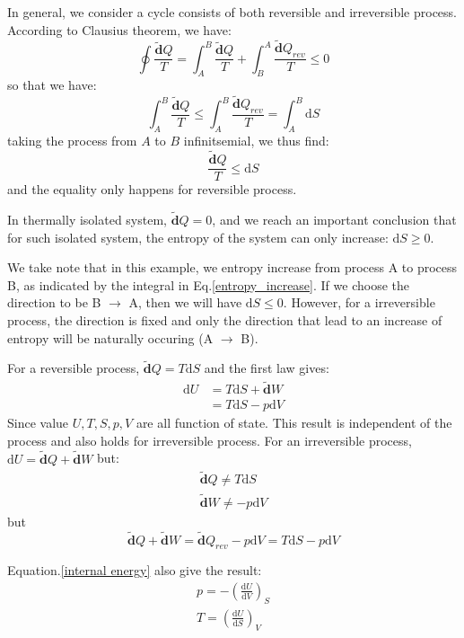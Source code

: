 \documentclass{article}
\newcommand{\dbar}{\mathbf{\tilde{d}}}
\newcommand{\dnor}{\text{d}}
\begin{document}
In general, we consider a cycle consists of both reversible and 
irreversible process. According to Clausius theorem, we have:
\begin{equation}
    \oint \frac{\dbar Q}{T} = \int_A^B \frac{\dbar Q}{T} + \int_B^A \frac{\dbar Q_{rev}}{T} \le 0
\end{equation}
so that we have:
\begin{equation}
    \int_A^B \frac{\dbar Q}{T} \le \int_A^B \frac{\dbar Q_{rev}}{T} = \int_A^B \dnor S  \label{entropy_increase}
\end{equation}
taking the process from $A$ to $B$ infinitsemial, we thus find:
\begin{equation}
    \frac{\dbar Q}{T} \le \dnor S
\end{equation}
and the equality only happens for reversible process.

In thermally isolated system, $\dbar Q = 0$, and we reach an
important conclusion that for such isolated system, the entropy
of the system can only increase: $ \dnor S \ge 0$.

We take note that in this example, we entropy increase from process A to process B, 
as indicated by the integral in Eq.\ref{entropy_increase}. If we choose the direction
to be B $\to$ A, then we will have  $ \dnor S \le 0$. However, for a irreversible process,
the direction is fixed and only the direction that lead to an increase of entropy
will be naturally occuring (A $\to$ B). 

For a reversible process, $\dbar Q = T \dnor S$ and the first law gives:
\begin{align}
    \dnor U & = T \dnor S + \dbar W \\
            & = T \dnor S - p \dnor V \label{internal energy}
\end{align}
Since value $U, T, S, p, V$ are all function of state. This 
result is independent of the process and also holds for 
irreversible process.
For an irreversible process, $\dnor U = \dbar Q + \dbar W$
but:
\begin{gather}
    \dbar Q \neq  T \dnor S \\
    \dbar W \neq  - p \dnor V 
\end{gather}
but 
\begin{equation}
    \dbar Q + \dbar W = \dbar Q_{rev} - p \dnor V = T \dnor S - p \dnor V
\end{equation}

Equation.\ref{internal energy} also give the result:
\begin{gather}
    p = - \left(\frac{\dnor U}{\dnor V}\right)_S \\
    T = \left(\frac{\dnor U}{\dnor S}\right)_V
\end{gather}
\end{document}
